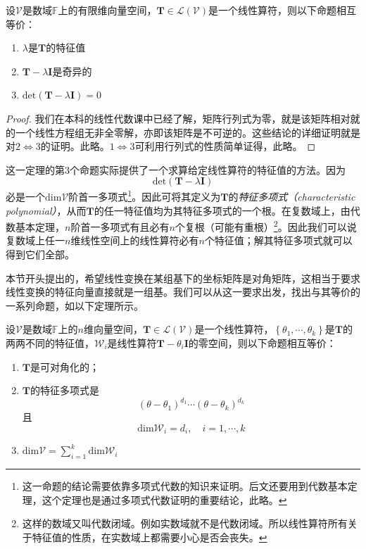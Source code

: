 \documentclass[main.tex]{subfiles}
\begin{document}
\begin{theorem}\label{thm:II.2.27}
    设$\mathcal{V}$是数域$\mathbb{F}$上的有限维向量空间，$\mathbf{T}\in\mathcal{L}\left(\mathcal{V}\right)$是一个线性算符，则以下命题相互等价：
    \begin{enumerate}
        \item $\lambda$是$\mathbf{T}$的特征值
        \item $\mathbf{T}-\lambda\mathbf{I}$是奇异的
        \item $\mathrm{det}\left(\mathbf{T}-\lambda\mathbf{I}\right)=0$
    \end{enumerate}
    \begin{proof}
        我们在本科的线性代数课中已经了解，矩阵行列式为零，就是该矩阵相对就的一个线性方程组无非全零解，亦即该矩阵是不可逆的。这些结论的详细证明就是对$2\Leftrightarrow 3$的证明。此略。$1\Leftrightarrow 3$可利用行列式的性质简单证得，此略。
    \end{proof}
\end{theorem}

这一定理的第3个命题实际提供了一个求算给定线性算符的特征值的方法。因为
\[\mathrm{det}\left(\mathbf{T}-\lambda\mathbf{I}\right)\]
必是一个$\mathrm{dim}\mathcal{V}$阶首一多项式\footnote{这一命题的结论需要依靠多项式代数的知识来证明。后文还要用到代数基本定理，这个定理也是通过多项式代数证明的重要结论，此略\cite{Hoffman1971}。}。因此可将其定义为$\mathbf{T}$的\emph{特征多项式}\emph{（characteristic polynomial）}，从而$\mathbf{T}$的任一特征值均为其特征多项式的一个根。在复数域上，由代数基本定理，$n$阶首一多项式有且必有$n$个复根（可能有重根）\footnote{这样的数域又叫代数闭域。例如实数域就不是代数闭域。所以线性算符所有关于特征值的性质，在实数域上都需要小心是否会丧失。}。因此我们可以说复数域上任一$n$维线性空间上的线性算符必有$n$个特征值；解其特征多项式就可以得到它们全部。

本节开头提出的，希望线性变换在某组基下的坐标矩阵是对角矩阵，这相当于要求线性变换的特征向量直接就是一组基。我们可以从这一要求出发，找出与其等价的一系列命题，如以下定理所示。

\begin{theorem}\label{thm:II.2.28}
    设$\mathcal{V}$是数域$\mathbb{F}$上的$n$维向量空间，$\mathbf{T}\in\mathcal{L}\left(\mathcal{V}\right)$是一个线性算符，$\left\{\theta_1,\cdots,\theta_k\right\}$是$\mathbf{T}$的两两不同的特征值，$\mathcal{W}_i$是线性算符$\mathbf{T}-\theta_i\mathbf{I}$的零空间，则以下命题相互等价：
    \begin{enumerate}
        \item $\mathbf{T}$是可对角化的；
        \item $\mathbf{T}$的特征多项式是
              \[\left(\theta-\theta_1\right)^{d_1}\cdots\left(\theta-\theta_k\right)^{d_k}\]
              且
              \[\mathrm{dim}\mathcal{W}_i=d_i,\quad i=1,\cdots,k\]
        \item $\mathrm{dim}\mathcal{V}=\sum_{i=1}^k\mathrm{dim}\mathcal{W}_i$
    \end{enumerate}
\end{theorem}
\end{document}

